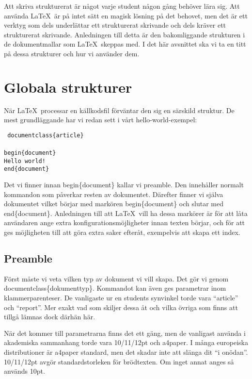 Att skriva strukturerat är något varje student någon gång behöver lära sig. Att använda \LaTeX\ är på intet sätt en magisk lösning på det behovet, men det är ett verktyg som dels underlättar ett strukturerat skrivande och dels kräver ett strukturerat skrivande. Anledningen till detta är den bakomliggande strukturen i de dokumentmallar som \LaTeX\ skeppas med. I det här avsnittet ska vi ta en titt på dessa strukturer och hur vi använder dem.
\section{Globala strukturer}
När \LaTeX\ processar en källkodsfil förväntar den sig en särskild struktur. De mest grundläggande har vi redan sett i vårt hello-world-exempel:

\texttt{
  \tb{}documentclass\{article\}\\\\
  \tb{}begin\{document\}\\
  \indent Hello world!\\
  \tb{}end\{document\}
}

Det vi finner innan \tb{}begin\{document\} kallar vi preamble. Den innehåller normalt kommandon som påverkar resten av dokumentet. Därefter finner vi själva dokumentet vilket börjar med markören \tb{}begin\{document\} och slutar med \tb{}end\{document\}. Anledningen till att \LaTeX\ vill ha dessa markörer är för att låta användaren ange extra konfigurationsmöjligheter innan texten börjar, och för att ges möjligheten till att göra extra saker efteråt, exempelvis att skapa ett index.

\subsection{Preamble}
Först måste vi veta vilken typ av dokument vi vill skapa. Det gör vi genom \tb{}documentclass\{dokumenttyp\}. Kommandot kan även ges parametrar inom klammerparenteser. De vanligaste ur en students synvinkel torde vara ``article'' och ``report''. Mer exakt vad som skiljer dessa åt och vilka övriga som finns att tillgå lämnas dock därhän här.

När det kommer till parametrarna finns det ett gäng, men de vanligast använda i akademiska sammanhang torde vara 10/11/12pt och a4paper. I många europeiska distributioner är a4paper standard, men det skadar inte att slänga dit ``i onödan''. 10/11/12pt avgör standardstorleken för brödtexten. Om inget annat anges så används 10pt.

